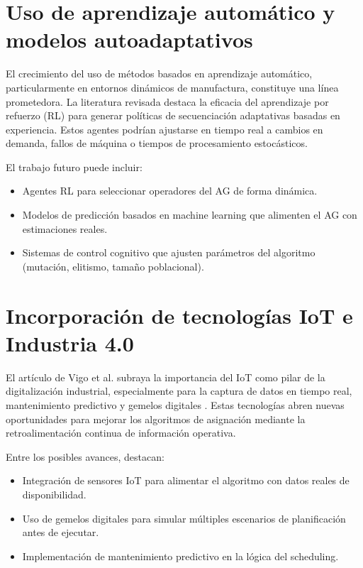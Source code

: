 \section{Uso de aprendizaje automático y modelos autoadaptativos}

El crecimiento del uso de métodos basados en aprendizaje automático, particularmente en 
entornos dinámicos de manufactura, constituye una línea prometedora. La literatura revisada 
\cite{file_momeni_review} destaca la eficacia del aprendizaje por refuerzo (RL) para generar políticas 
de secuenciación adaptativas basadas en experiencia. Estos agentes podrían ajustarse en tiempo 
real a cambios en demanda, fallos de máquina o tiempos de procesamiento estocásticos.

El trabajo futuro puede incluir:
\begin{itemize}
    \item Agentes RL para seleccionar operadores del AG de forma dinámica.
    \item Modelos de predicción basados en machine learning que alimenten el AG con estimaciones reales.
    \item Sistemas de control cognitivo que ajusten parámetros del algoritmo (mutación, elitismo, tamaño poblacional).
\end{itemize}

\section{Incorporación de tecnologías IoT e Industria 4.0}

El artículo de Vigo et al. subraya la importancia del IoT como pilar de la digitalización industrial, 
especialmente para la captura de datos en tiempo real, mantenimiento predictivo y gemelos 
digitales \cite{file_iot}. Estas tecnologías abren nuevas oportunidades para mejorar los algoritmos de 
asignación mediante la retroalimentación continua de información operativa.

Entre los posibles avances, destacan:
\begin{itemize}
    \item Integración de sensores IoT para alimentar el algoritmo con datos reales de disponibilidad.
    \item Uso de gemelos digitales para simular múltiples escenarios de planificación antes de ejecutar.
    \item Implementación de mantenimiento predictivo en la lógica del scheduling.
\end{itemize}

